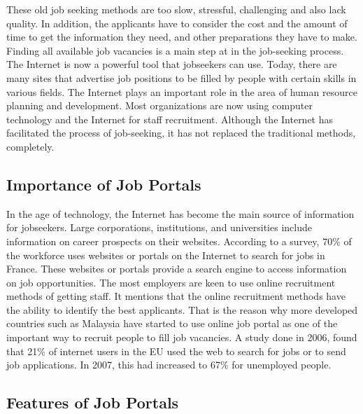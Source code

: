 \documentclass[a4paper,12pt]{report}
\begin{document}
These old job seeking methods are too slow, stressful, challenging and also lack quality. In addition, the applicants have to consider the cost and the amount of time to get the information they need, and other preparations they have to make. Finding all available job vacancies is a main step at in the job-seeking process. The Internet is now a powerful tool that jobseekers can use. Today, there are many sites that advertise job positions to be filled by people with certain skills in various fields. The Internet plays an important role in the area of human resource planning and development. Most organizations are now using computer technology and the Internet for staff recruitment. Although the Internet has facilitated the process of job-seeking, it has not replaced the traditional methods, completely.

\subsection{Importance of Job Portals}

\hspace*{12pt}In the age of technology, the Internet has become the main source of information for jobseekers. Large corporations, institutions, and universities include information on career prospects on their websites. According to a survey, 70\% of the workforce uses websites or portals on the Internet to search for jobs in France. These websites or portals provide a search engine to access information on job opportunities. The most employers are keen to use online recruitment methods of getting staff. It mentions that the online recruitment methods have the ability to identify the best applicants. That is the reason why more developed countries such as Malaysia have started to use online job portal as one of the important way to recruit people to fill job vacancies. A study done in 2006, found that 21\% of internet users in the EU used the web to search for jobs or to send job applications. In 2007, this had increased to 67\% for unemployed people. \\


\subsection{Features of Job Portals}
\end{document}
